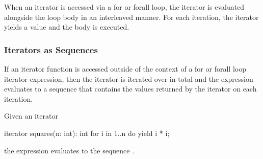When an iterator is accessed via a for or forall loop, the iterator is
evaluated alongside the loop body in an interleaved manner.  For each
iteration, the iterator yields a value and the body is executed.

\subsubsection{Iterators as Sequences}
\label{Iterators_as_Sequences}

If an iterator function is accessed outside of the context of a for or
forall loop iterator expression, then the iterator is iterated over in
total and the expression evaluates to a sequence that contains the
values returned by the iterator on each iteration.
\begin{example}
Given an iterator
\begin{chapel}
iterator squares(n: int): int {
  for i in 1..n do
    yield i * i;
}
\end{chapel}
the expression  evaluates to the sequence .
\end{example}
